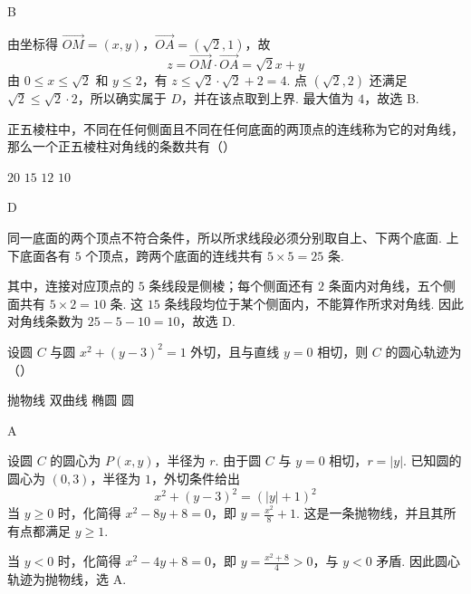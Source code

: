 \begin{answer}
B
\end{answer}

\begin{solution}
由坐标得 \(\overrightarrow{OM}=(x,y)\)，\(\overrightarrow{OA}=(\sqrt{2},1)\)，故
\[
z=\overrightarrow{OM}\cdot\overrightarrow{OA}=\sqrt{2}x+y
\]
由 \(0\leqslant x\leqslant\sqrt{2}\) 和 \(y\leqslant2\)，有 \(z\leqslant\sqrt{2}\cdot\sqrt{2}+2=4\). 点 \((\sqrt{2},2)\) 还满足 \(\sqrt{2}\leqslant\sqrt{2}\cdot2\)，所以确实属于 \(D\)，并在该点取到上界. 最大值为 \(4\)，故选 B.
\end{solution}

\begin{problem}
正五棱柱中，不同在任何侧面且不同在任何底面的两顶点的连线称为它的对角线，那么一个正五棱柱对角线的条数共有（\quad）

\choices
    {\(20\)}
    {\(15\)}
    {\(12\)}
    {\(10\)}
\end{problem}

\begin{answer}
D
\end{answer}

\begin{solution}
同一底面的两个顶点不符合条件，所以所求线段必须分别取自上、下两个底面. 上下底面各有 \(5\) 个顶点，跨两个底面的连线共有 \(5\times5=25\) 条.

其中，连接对应顶点的 \(5\) 条线段是侧棱；每个侧面还有 \(2\) 条面内对角线，五个侧面共有 \(5\times2=10\) 条. 这 \(15\) 条线段均位于某个侧面内，不能算作所求对角线. 因此对角线条数为 \(25-5-10=10\)，故选 D.
\end{solution}

\begin{problem}
设圆 \(C\) 与圆 \(x^{2}+(y-3)^{2}=1\) 外切，且与直线 \(y=0\) 相切，则 \(C\) 的圆心轨迹为（\quad）

\choices
    {抛物线}
    {双曲线}
    {椭圆}
    {圆}
\end{problem}

\begin{answer}
A
\end{answer}

\begin{solution}
设圆 \(C\) 的圆心为 \(P(x,y)\)，半径为 \(r\). 由于圆 \(C\) 与 \(y=0\) 相切，\(r=|y|\). 已知圆的圆心为 \((0,3)\)，半径为 \(1\)，外切条件给出
\[
x^2+(y-3)^2=(|y|+1)^2
\]
当 \(y\geqslant0\) 时，化简得 \(x^2-8y+8=0\)，即 \(y=\frac{x^2}{8}+1\). 这是一条抛物线，并且其所有点都满足 \(y\geqslant1\).

当 \(y<0\) 时，化简得 \(x^2-4y+8=0\)，即 \(y=\frac{x^2+8}{4}>0\)，与 \(y<0\) 矛盾. 因此圆心轨迹为抛物线，选 A.
\end{solution}


